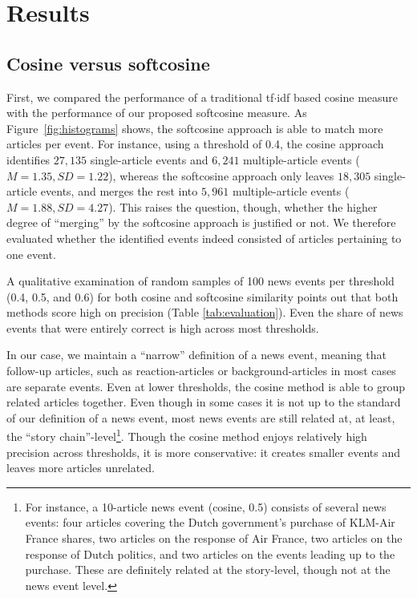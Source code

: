 \documentclass[a4paper,man,natbib,floatsintext,mask]{apa6}
\begin{document}
\section{Results}

\subsection{Cosine versus softcosine}
First, we compared the performance of a traditional tf$\cdot$idf based cosine measure with the performance of our proposed softcosine measure.
As Figure~\ref{fig:histograms} shows, the softcosine approach is able to match more articles per event. 
For instance, using a threshold of 0.4, the cosine approach identifies $27,135$ single-article events and $6,241$ multiple-article events ($M = 1.35, SD = 1.22$), whereas the softcosine approach only leaves $18,305$ single-article events, and merges the rest into $5,961$ multiple-article events ($M = 1.88, SD = 4.27$).
This raises the question, though, whether the higher degree of ``merging'' by the softcosine approach is justified or not.
We therefore evaluated whether the identified events indeed consisted of articles pertaining to one event.

A qualitative examination of random samples of 100 news events per threshold (0.4, 0.5, and 0.6) for both cosine and softcosine similarity points out that both methods score high on precision (Table \ref{tab:evaluation}). Even the share of news events that were entirely correct is high across most thresholds.

In our case, we maintain a ``narrow'' definition of a news event, meaning that follow-up articles, such as reaction-articles or background-articles in most cases are separate events. Even at lower thresholds, the cosine method is able to group related articles together. Even though in some cases it is not up to the standard of our definition of a news event, most news events are still related at, at least, the ``story chain''-level\footnote{For instance, a 10-article news event (cosine, 0.5) consists of several news events: four articles covering the Dutch government's purchase of KLM-Air France shares, two articles on the response of Air France, two articles on the response of Dutch politics, and two articles on the events leading up to the purchase. These are definitely related at the story-level, though not at the news event level.}. Though the cosine method enjoys relatively high precision across thresholds, it is more conservative: it creates smaller events and leaves more articles unrelated. 
\end{document}
